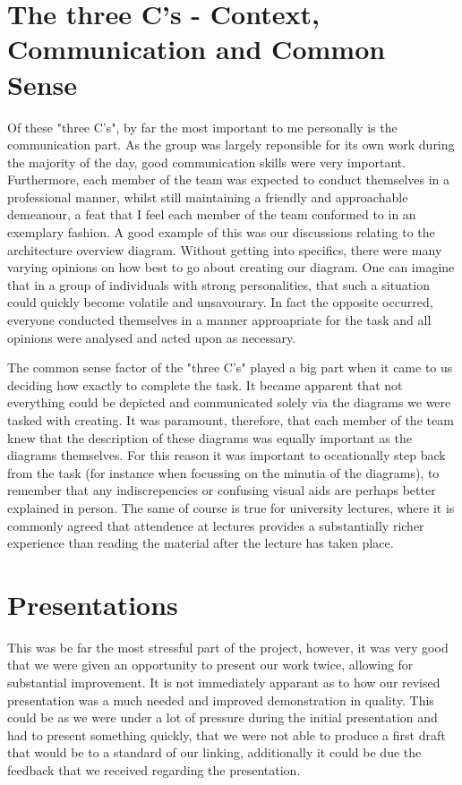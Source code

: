 \documentclass[12pt]{article} %
\begin{document}
\section{The three C's - Context, Communication and Common Sense}
Of these "three C's", by far the most important to me personally is the communication part. As the group was largely reponsible for its own work during the majority of the day, good communication skills were very important. Furthermore, each member of the team was expected to conduct themselves in a professional manner, whilst still maintaining a friendly and approachable demeanour, a feat that I feel each member of the team conformed to in an exemplary fashion. A good example of this was our discussions relating to the architecture overview diagram. Without getting into specifics, there were many varying opinions on how best to go about creating our diagram. One can imagine that in a group of individuals with strong personalities, that such a situation could quickly become volatile and unsavourary. In fact the opposite occurred, everyone conducted themselves in a manner approapriate for the task and all opinions were analysed and acted upon as necessary.

The common sense factor of the "three C's" played a big part when it came to us deciding how exactly to complete the task. It became apparent that not everything could be depicted and communicated solely via the diagrams we were tasked with creating. It was paramount, therefore, that each member of the team knew that the description of these diagrams was equally important as the diagrams themselves. For this reason it was important to occationally step back from the task (for instance when focussing on the minutia of the diagrams), to remember that any indiscrepencies or confusing visual aids are perhaps better explained in person. The same of course is true for university lectures, where it is commonly agreed that attendence at lectures provides a substantially richer experience than reading the material after the lecture has taken place.

\section{Presentations}

This was be far the most stressful part of the project, however, it was very good that we were given an opportunity to present our work twice, allowing for substantial improvement. It is not immediately apparant as to how our revised presentation was a much needed and improved demonstration in quality. This could be as we were under a lot of pressure during the initial presentation and had to present something quickly, that we were not able to produce a first draft that would be to a standard of our linking, additionally it could be due the feedback that we received regarding the presentation.
\end{document}
